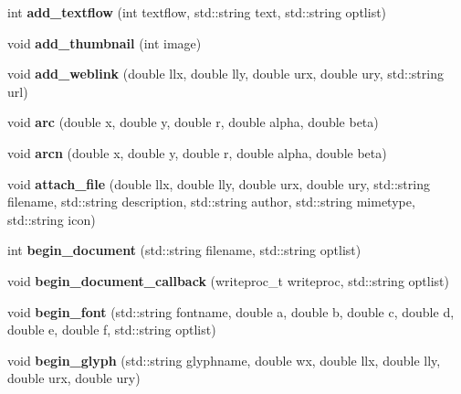 \begin{DoxyCompactItemize}
\hypertarget{classPDFlib_a44f52fd96b6152a2b4ae4f71cebcf36b}{}\label{classPDFlib_a44f52fd96b6152a2b4ae4f71cebcf36b} 
int {\bfseries add\+\_\+textflow} (int textflow, std\+::string text, std\+::string optlist)
\item 
\hypertarget{classPDFlib_a7561fadef64e392f98d047d5b6e79946}{}\label{classPDFlib_a7561fadef64e392f98d047d5b6e79946} 
void {\bfseries add\+\_\+thumbnail} (int image)
\item 
\hypertarget{classPDFlib_afdba46325698218399dda4b415204edd}{}\label{classPDFlib_afdba46325698218399dda4b415204edd} 
void {\bfseries add\+\_\+weblink} (double llx, double lly, double urx, double ury, std\+::string url)
\item 
\hypertarget{classPDFlib_aee884c54b243c01230926f493f06eaf9}{}\label{classPDFlib_aee884c54b243c01230926f493f06eaf9} 
void {\bfseries arc} (double x, double y, double r, double alpha, double beta)
\item 
\hypertarget{classPDFlib_a061eb6bb4e041c52547cf9d58416ddac}{}\label{classPDFlib_a061eb6bb4e041c52547cf9d58416ddac} 
void {\bfseries arcn} (double x, double y, double r, double alpha, double beta)
\item 
\hypertarget{classPDFlib_a911b3c91d2670200cdb3b78742fc6980}{}\label{classPDFlib_a911b3c91d2670200cdb3b78742fc6980} 
void {\bfseries attach\+\_\+file} (double llx, double lly, double urx, double ury, std\+::string filename, std\+::string description, std\+::string author, std\+::string mimetype, std\+::string icon)
\item 
\hypertarget{classPDFlib_aacb38db7f6eada3409fb616bd823e79f}{}\label{classPDFlib_aacb38db7f6eada3409fb616bd823e79f} 
int {\bfseries begin\+\_\+document} (std\+::string filename, std\+::string optlist)
\item 
\hypertarget{classPDFlib_a0c3289b502ca325c222c4df9c8318d1f}{}\label{classPDFlib_a0c3289b502ca325c222c4df9c8318d1f} 
void {\bfseries begin\+\_\+document\+\_\+callback} (writeproc\+\_\+t writeproc, std\+::string optlist)
\item 
\hypertarget{classPDFlib_a3f8a5ee80b6c632c1687e3100ef4a1bb}{}\label{classPDFlib_a3f8a5ee80b6c632c1687e3100ef4a1bb} 
void {\bfseries begin\+\_\+font} (std\+::string fontname, double a, double b, double c, double d, double e, double f, std\+::string optlist)
\item 
\hypertarget{classPDFlib_adeb917523298b8df07d5a0161dca81ca}{}\label{classPDFlib_adeb917523298b8df07d5a0161dca81ca} 
void {\bfseries begin\+\_\+glyph} (std\+::string glyphname, double wx, double llx, double lly, double urx, double ury)

\end{DoxyCompactItemize}
